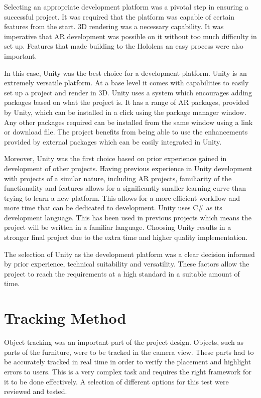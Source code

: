 \documentclass{l4proj}
\begin{document}
Selecting an appropriate development platform was a pivotal step in ensuring a successful project. It was required that the platform was capable of certain features from the start. 3D rendering was a necessary capability. It was imperative that AR development was possible on it without too much difficulty in set up. Features that made building to the Hololens an easy process were also important.

In this case, Unity was the best choice for a development platform. Unity is an extremely versatile platform. At a base level it comes with capabilities to easily set up a project and render in 3D. Unity uses a system which encourages adding packages based on what the project is. It has a range of AR packages, provided by Unity, which can be installed in a click using the package manager window. Any other packages required can be installed from the same window using a link or download file. The project benefits from being able to use the enhancements provided by external packages which can be easily integrated in Unity.

Moreover, Unity was the first choice based on prior experience gained in development of other projects. Having previous experience in Unity development with projects of a similar nature, including AR projects, familiarity of the functionality and features allows for a significantly smaller learning curve than trying to learn a new platform. This allows for a more efficient workflow and more time that can be dedicated to development. Unity uses C# as its development language. This has been used in previous projects which means the project will be written in a familiar language. Choosing Unity results in a stronger final project due to the extra time and higher quality implementation.

The selection of Unity as the development platform was a clear decision informed by prior experience, technical suitability and versatility. These factors allow the project to reach the requirements at a high standard in a suitable amount of time.

\section{Tracking Method}

Object tracking was an important part of the project design. Objects, such as parts of the furniture, were to be tracked in the camera view. These parts had to be accurately tracked in real time in order to verify the placement and highlight errors to users. This is a very complex task and requires the right framework for it to be done effectively. A selection of different options for this test were reviewed and tested.
\end{document}
